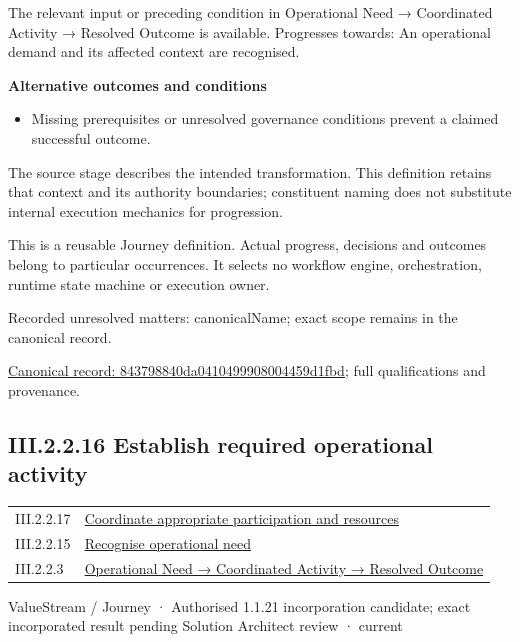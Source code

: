The relevant input or preceding condition in Operational Need → Coordinated Activity → Resolved Outcome is available. Progresses towards: An operational demand and its affected context are recognised.



\par\medskip\textbf{Alternative outcomes and conditions}\par


\begin{itemize}


\item Missing prerequisites or unresolved governance conditions prevent a claimed successful outcome.

\end{itemize}


The source stage describes the intended transformation. This definition retains that context and its authority boundaries; constituent naming does not substitute internal execution mechanics for progression.



This is a reusable Journey definition. Actual progress, decisions and outcomes belong to particular occurrences. It selects no workflow engine, orchestration, runtime state machine or execution owner.


{\small Recorded unresolved matters: canonicalName; exact scope remains in the canonical record.}\par
{\footnotesize \href{../../../../continuum/strategy/value-stream/843798840da0410499908004459d1fbd.md}{Canonical record: 843798840da0410499908004459d1fbd}; full qualifications and provenance.}\par
\subsection*{III.2.2.16 Establish required operational activity}
\label{navigation:III.2.2.16}

\begin{longtable}{p{.22\linewidth}p{.73\linewidth}}
III.2.2.17 & \hyperref[element:429446296e4b4a64a11b1b3d8385b12e]{Coordinate appropriate participation and resources} \\
III.2.2.15 & \hyperref[element:843798840da0410499908004459d1fbd]{Recognise operational need} \\
III.2.2.3 & \hyperref[element:beea615ca7b34bbcbd0ad3a2a6ab2cff]{Operational Need → Coordinated Activity → Resolved Outcome} \\
\end{longtable}
\label{element:a3d8f16b4c69430e9024f002bdfb6c86}
{\small ValueStream / Journey · Authorised 1.1.21 incorporation candidate; exact incorporated result pending Solution Architect review · current}\par

